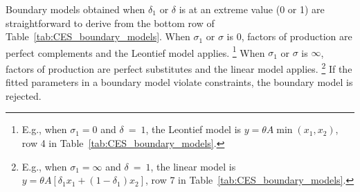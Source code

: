 \documentclass[preprint,10pt,3p]{elsarticle}\usepackage[]{graphicx}\usepackage[]{color}
\begin{document}
Boundary models obtained when $\delta_1$ or $\delta$ is at an extreme value
(0 or 1)
are straightforward to derive from the bottom row of
Table~\ref{tab:CES_boundary_models}.
When $\sigma_1$ or $\sigma$ is 0,
factors of production are perfect complements
and the Leontief model applies.%
  \footnote{
  E.g., when $\sigma_1 = 0$ and $\delta~=~1$, the Leontief model is
  $y = \theta A \min (x_1, x_2)$, row 4 in Table~\ref{tab:CES_boundary_models}.
  }
When $\sigma_1$ or $\sigma$ is $\infty$,
factors of production are perfect substitutes
and the linear model applies.%
  \footnote{
  E.g., when $\sigma_1 = \infty$ and $\delta~=~1$, the linear model is
  $y = \theta A \left[ \delta_1 x_1 + (1 - \delta_1) x_2 \right]$,
  row 7 in Table~\ref{tab:CES_boundary_models}.
  }
If the fitted parameters in a boundary model violate constraints,
the boundary model is rejected.
%
\end{document}
